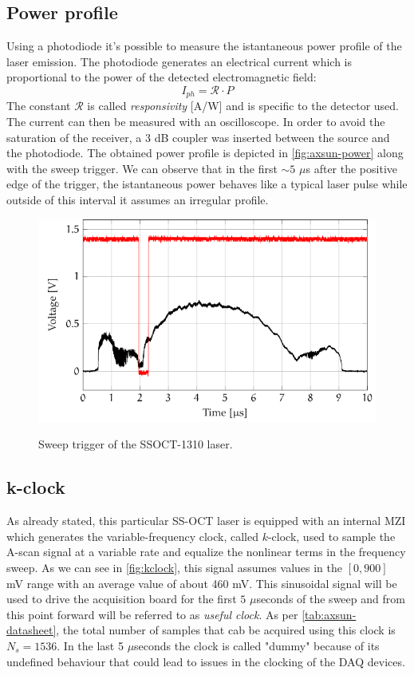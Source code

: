\subsection{Power profile}
Using a photodiode it's possible to measure the istantaneous power profile of the laser emission. The photodiode generates an electrical current which is proportional to the power of the detected electromagnetic field: 
\begin{equation}
	I_{ph} = \mathcal{R} \cdot P 
\end{equation}
The constant $\mathcal{R}$ is called \emph{responsivity} [A/W] and is specific to the detector used. The current can then be measured with an oscilloscope. In order to avoid the saturation of the receiver, a 3 dB coupler was inserted between the source and the photodiode. The obtained power profile is depicted in \autoref{fig:axsun-power} along with the sweep trigger. We can observe that in the first $\sim 5$ $\mu$s after the positive edge of the trigger, the istantaneous power behaves like a typical laser pulse while outside of this interval it assumes an irregular profile. 


\begin{figure}[hbt]
	\myfloatalign
	{\includegraphics[width=0.8\linewidth]{gfx/ch3/power-profile}}\\
	\caption{Sweep trigger of the SSOCT-1310 laser.}\label{fig:axsun-power}
\end{figure}


\subsection{k-clock}
As already stated, this particular SS-OCT laser is equipped with an internal \ac{MZI} which generates the variable-frequency clock, called $k$-clock, used to sample the A-scan signal at a variable rate and equalize the nonlinear terms in the frequency sweep. As we can see in \autoref{fig:kclock}, this signal assumes values in the $[0, 900]$ mV range with an average value of about 460 mV. This sinusoidal signal will be used to drive the acquisition board for the first $5$ $\mu$seconds of the sweep and from this point forward will be referred to as \emph{useful clock}. As per \autoref{tab:axsun-datasheet}, the total number of samples that cab be acquired using this clock is $N_s = 1536$. In the last 5 $\mu$seconds the clock is called "dummy" because of its undefined behaviour that could lead to issues in the clocking of the DAQ devices.

